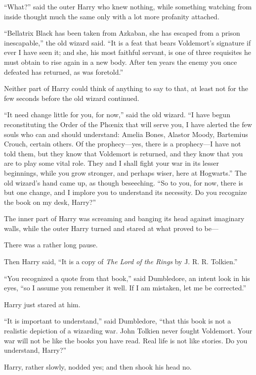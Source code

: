 “What?” said the outer Harry who knew nothing, while something watching from inside thought much the same only with a lot more profanity attached.

“Bellatrix Black has been taken from Azkaban, she has escaped from a prison inescapable,” the old wizard said. “It is a feat that bears Voldemort’s signature if ever I have seen it; and she, his most faithful servant, is one of three requisites he must obtain to rise again in a new body. After ten years the enemy you once defeated has returned, as was foretold.”

Neither part of Harry could think of anything to say to that, at least not for the few seconds before the old wizard continued.

“It need change little for you, for now,” said the old wizard. “I have begun reconstituting the Order of the Phœnix that will serve you, I have alerted the few souls who can and should understand: Amelia Bones, Alastor Moody, Bartemius Crouch, certain others. Of the prophecy—yes, there is a prophecy—I have not told them, but they know that Voldemort is returned, and they know that you are to play some vital role. They and I shall fight your war in its lesser beginnings, while you grow stronger, and perhaps wiser, here at Hogwarts.” The old wizard’s hand came up, as though beseeching. “So to you, for now, there is but one change, and I implore you to understand its necessity. Do you recognize the book on my desk, Harry?”

The inner part of Harry was screaming and banging its head against imaginary walls, while the outer Harry turned and stared at what proved to be—

There was a rather long pause.

Then Harry said, “It is a copy of \emph{The Lord of the Rings} by J. R. R. Tolkien.”

“You recognized a quote from that book,” said Dumbledore, an intent look in his eyes, “so I assume you remember it well. If I am mistaken, let me be corrected.”

Harry just stared at him.

“It is important to understand,” said Dumbledore, “that this book is not a realistic depiction of a wizarding war. John Tolkien never fought Voldemort. Your war will not be like the books you have read. Real life is not like stories. Do you understand, Harry?”

Harry, rather slowly, nodded yes; and then shook his head no.

